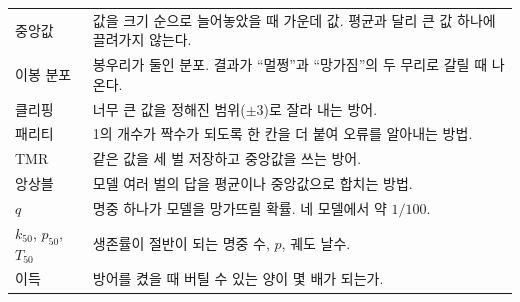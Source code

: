 \documentclass[11pt,a4paper]{article}
\begin{document}
\begin{table}[H]
\begin{tabular}{lp{11.2cm}}
    중앙값 & 값을 크기 순으로 늘어놓았을 때 가운데 값. 평균과 달리 큰 값 하나에 끌려가지 않는다. \\
    이봉 분포 & 봉우리가 둘인 분포. 결과가 ``멀쩡''과 ``망가짐''의 두 무리로 갈릴 때 나온다. \\
    클리핑 & 너무 큰 값을 정해진 범위($\pm3$)로 잘라 내는 방어. \\
    패리티 & 1의 개수가 짝수가 되도록 한 칸을 더 붙여 오류를 알아내는 방법. \\
    TMR & 같은 값을 세 벌 저장하고 중앙값을 쓰는 방어. \\
    앙상블 & 모델 여러 벌의 답을 평균이나 중앙값으로 합치는 방법. \\
    $q$ & 명중 하나가 모델을 망가뜨릴 확률. 네 모델에서 약 $1/100$. \\
    $k_{50}$, $p_{50}$, $T_{50}$ & 생존률이 절반이 되는 명중 수, $p$, 궤도 날수. \\
    이득 & 방어를 켰을 때 버틸 수 있는 양이 몇 배가 되는가. \\
    \bottomrule
  \end{tabular}
\end{table}
\end{document}
